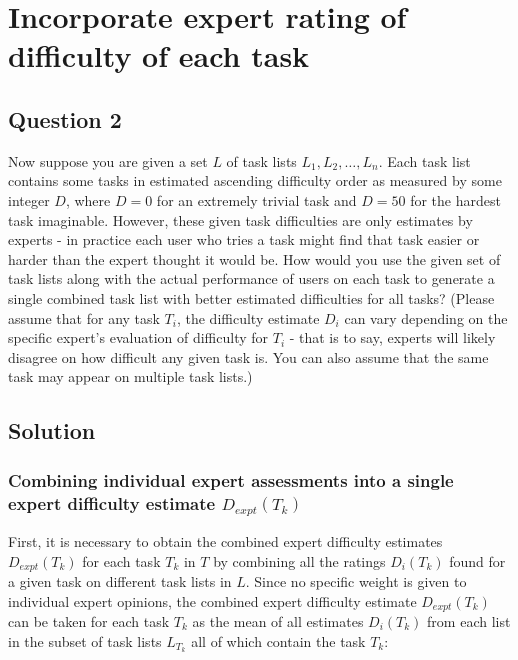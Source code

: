 \chapter{Incorporate expert rating of difficulty of each task} \label{ch:q2_expert_rating}

\section{Question 2} \label{sec:q2}

Now suppose you are given a set $L$ of task lists $L_1, L_2, \dots, L_n$.
Each task list contains some tasks in estimated ascending difficulty order as measured by some integer $D$, where $D = 0$ for an extremely trivial task and $D = 50$ for the hardest task imaginable.
However, these given task difficulties are only estimates by experts - in practice each user who tries a task might find that task easier or harder than the expert thought it would be.
How would you use the given set of task lists along with the actual performance of users on each task to generate a single combined task list with better estimated difficulties for all tasks?
(Please assume that for any task $T_i$, the difficulty estimate $D_i$ can vary depending on the specific expert's evaluation of difficulty for $T_i$ - that is to say, experts will likely disagree on how difficult any given task is.
You can also assume that the same task may appear on multiple task lists.)

\section{Solution} \label{sec:q2_solution}

\subsection{Combining individual expert assessments into a single expert difficulty estimate $D_{expt}(T_k)$} \label{subsec:q2_dexp}

First, it is necessary to obtain the combined expert difficulty estimates $D_{expt}(T_k)$ for each task $T_k$ in $T$ by combining all the ratings $D_i(T_k)$ found for a given task on different task lists in $L$.
Since no specific weight is given to individual expert opinions, the combined expert difficulty estimate $D_{expt}(T_k)$ can be taken for each task $T_k$ as the mean of all estimates $D_i(T_k)$ from each list in the subset of task lists $L_{T_k}$ all of which contain the task $T_k$:

